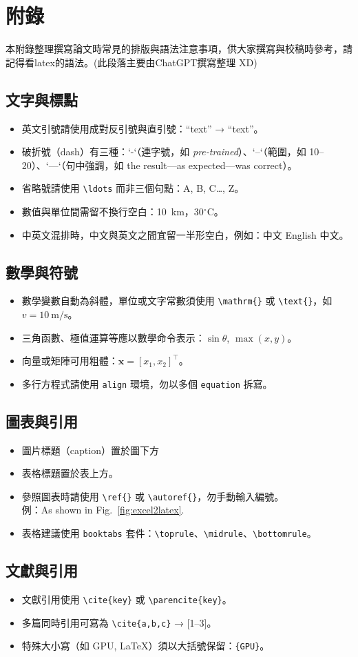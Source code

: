 \chapter{附錄}
\label{ch:appendix}

本附錄整理撰寫論文時常見的排版與語法注意事項，供大家撰寫與校稿時參考，請記得看latex的語法。(此段落主要由ChatGPT撰寫整理 XD)

\section*{文字與標點}
\begin{itemize}
  \item 英文引號請使用成對反引號與直引號：``text'' → “text”。
  \item 破折號（dash）有三種：`-`（連字號，如 \textit{pre-trained}）、`--`（範圍，如 10--20）、`---`（句中強調，如 the result---as expected---was correct）。
  \item 省略號請使用 \verb|\ldots| 而非三個句點：A, B, C\ldots, Z。
  \item 數值與單位間需留不換行空白：10~km，30$^\circ$C。
  \item 中英文混排時，中文與英文之間宜留一半形空白，例如：中文 English 中文。
\end{itemize}

\section*{數學與符號}
\begin{itemize}
  \item 數學變數自動為斜體，單位或文字常數須使用 \verb|\mathrm{}| 或 \verb|\text{}|，如 $v=10~\mathrm{m/s}$。
  \item 三角函數、極值運算等應以數學命令表示：$\sin\theta$, $\max(x,y)$。
  \item 向量或矩陣可用粗體：$\mathbf{x}=[x_1,x_2]^\top$。
  \item 多行方程式請使用 \texttt{align} 環境，勿以多個 \texttt{equation} 拆寫。
\end{itemize}


\section*{圖表與引用}
\begin{itemize}
  \item 圖片標題（caption）置於圖下方
  \item 表格標題置於表上方。
  \item 參照圖表時請使用 \verb|\ref{}| 或 \verb|\autoref{}|，勿手動輸入編號。\\
        例：As shown in Fig.~\ref{fig:excel2latex}.
  \item 表格建議使用 \texttt{booktabs} 套件：\verb|\toprule|、\verb|\midrule|、\verb|\bottomrule|。
\end{itemize}

\section*{文獻與引用}
\begin{itemize}
  \item 文獻引用使用 \verb|\cite{key}| 或 \verb|\parencite{key}|。
  \item 多篇同時引用可寫為 \verb|\cite{a,b,c}| → [1–3]。
  \item 特殊大小寫（如 GPU, LaTeX）須以大括號保留：\verb|{GPU}|。
\end{itemize}
